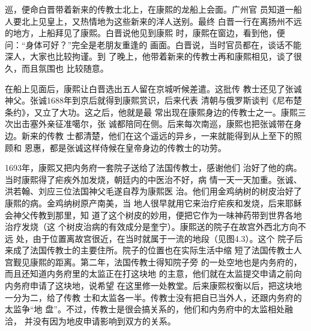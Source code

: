 巡，便命白晋带着新来的传教士北上，在康熙的龙船上会面。广州官%
员知道一船人要北上见皇上，又热情地为这些新来的洋人送别。最终%
白晋一行在离扬州不远的地方，上船拜见了康熙。白晋说他见到康熙%
时，康熙在窗边，看到他，便问：“身体可好？”完全是老朋友重逢的%
画面。白晋说，当时官员都在，谈话不能深人，大家也比较拘谨。到%
了晚上，他带着新来的传教士再和康熙相见，谈了很久，而且氛围也%
比较随意。%
\par
在船上见面后，康熙让白晋选出五人留在京城听候差遣。这批传%
教士还见了张诚神父。张诚1688年到京后就得到康熙赏识，后来代表%
清朝与俄罗斯谈判《尼布楚条约》，又立了大功。这之后，他就是最%
常出现在康熙身边的传教士之一。康熙三次出击塞外亲征准噶尔，张%
诚都陪同在侧。后来每次南巡，康熙也把张诚带在身边。新来的传教%
士都清楚，他们在这个遥远的异乡，一来就能得到从上至下的照顾和%
恩惠，都是张诚这样侍候在皇帝身边的传教士的功劳。%
\par
1693年，康熙又把内务府一套院子送给了法国传教士，感谢他们%
治好了他的病。当时康熙得了疟疾外加发烧，朝廷内的中医治不好，病%
情一天一天加重。张诚、洪若翰、刘应三位法国神父毛遂自荐为康熙医%
治。他们用金鸡纳树的树皮治好了康熙的病。金鸡纳树原产南美，当%
地人很早就用它来治疗疟疾和发烧，后来耶稣会神父传教到那里，知%
道了这个树皮的妙用，便把它作为一味神药带到世界各地治疗发烧（这%
个树皮治病的有效成分是奎宁）。康熙送的院子在故宫外西北方向不远%
处，由于位置离故宫很近，在当时就属于一流的地段（见图4.3）。这个%
院子后来成了法国传教士的主要住所。院子的位置也在实际生活中缩%
短了法国传教士人宫觐见康熙的距离。第二年，法国传教士得知院子旁%
的一处空地也是内务府的，而且还知道内务府里的太监正在打这块地%
的主意，他们就在太监提交申请之前向内务府申请了这块地，说希望%
在这里修一处教堂。后来康熙权衡以后，把这块地一分为二，给了传教%
士和太监各一半。传教士没有把自已当外人，还跟内务府的太监争“地%
盘”。不过，传教士是很会搞关系的，他们和内务府中的太监相处融洽，%
并没有因为地皮申请影响到双方的关系。%
